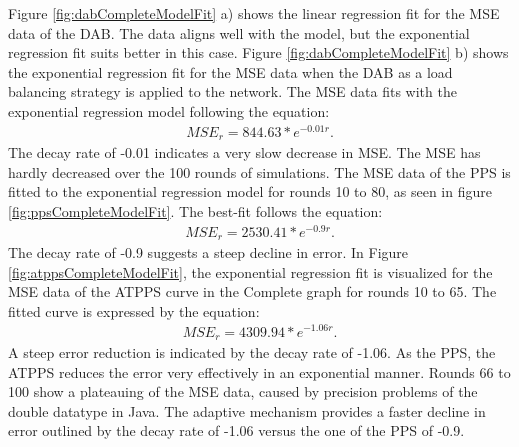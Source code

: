 Figure \ref{fig:dabCompleteModelFit} a) shows the linear regression fit for the MSE data of the DAB. The data aligns well with the model, but the exponential regression fit suits better in this case. Figure \ref{fig:dabCompleteModelFit} b) shows the exponential regression fit for the MSE data when the DAB as a load balancing strategy is applied to the network. The MSE data fits with the exponential regression model following the equation:
\begin{align}
    MSE_r=844.63*e^{-0.01r}.    
\end{align}
The decay rate of -0.01 indicates a very slow decrease in MSE. The MSE has hardly decreased over the 100 rounds of simulations. The MSE data of the PPS is fitted to the exponential regression model for rounds 10 to 80, as seen in figure \ref{fig:ppsCompleteModelFit}. The best-fit follows the equation:
\begin{align}
    MSE_r=2530.41*e^{-0.9r}.    
\end{align}
The decay rate of -0.9 suggests a steep decline in error. In Figure \ref{fig:atppsCompleteModelFit}, the exponential regression fit is visualized for the MSE data of the ATPPS curve in the Complete graph for rounds 10 to 65. The fitted curve is expressed by the equation:
\begin{align}
    MSE_r=4309.94*e^{-1.06r}.    
\end{align}
A steep error reduction is indicated by the decay rate of -1.06. As the PPS, the ATPPS reduces the error very effectively in an exponential manner. Rounds 66 to 100 show a plateauing of the MSE data, caused by precision problems of the double datatype in Java. The adaptive mechanism provides a faster decline in error outlined by the decay rate of -1.06 versus the one of the PPS of -0.9.

